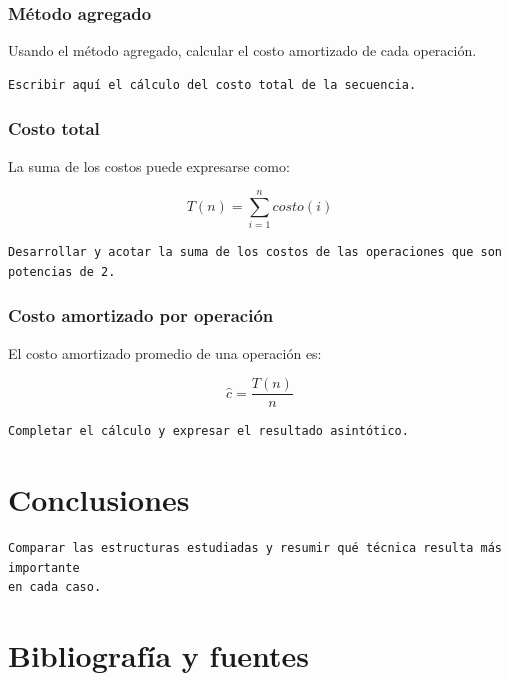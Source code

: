 \documentclass[11pt]{article}
\begin{document}
\subsubsection{Método agregado}
\label{sec:org1fcb5b1}

Usando el método agregado, calcular el costo amortizado de cada operación.

\begin{verbatim}
Escribir aquí el cálculo del costo total de la secuencia.
\end{verbatim}

\subsubsection{Costo total}
\label{sec:org6c0d6d2}

La suma de los costos puede expresarse como:

\[
T(n) = \sum_{i=1}^{n} costo(i)
\]

\begin{verbatim}
Desarrollar y acotar la suma de los costos de las operaciones que son potencias de 2.
\end{verbatim}

\subsubsection{Costo amortizado por operación}
\label{sec:org8764d14}

El costo amortizado promedio de una operación es:

\[
\widehat{c} = \frac{T(n)}{n}
\]

\begin{verbatim}
Completar el cálculo y expresar el resultado asintótico.
\end{verbatim}

\section{Conclusiones}
\label{sec:orgc0ef1f4}

\begin{verbatim}
Comparar las estructuras estudiadas y resumir qué técnica resulta más importante
en cada caso.
\end{verbatim}

\section{Bibliografía y fuentes}
\label{sec:org864f144}
\end{document}
